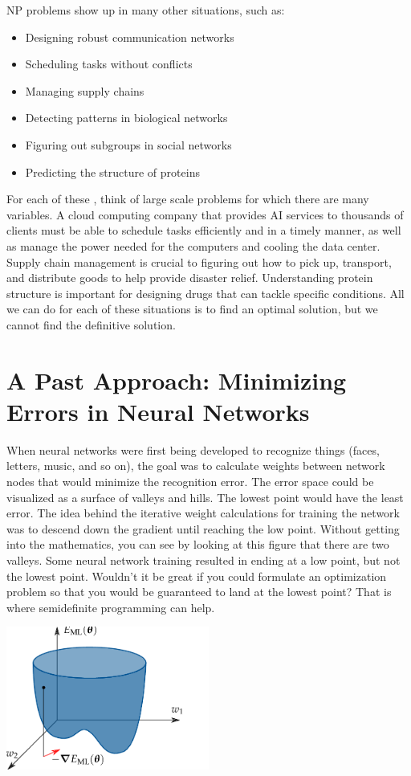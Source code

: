 NP problems show up in many other situations, such as:
\begin{itemize}
\item Designing  robust communication networks
\item Scheduling tasks without conflicts
\item Managing supply chains
\item Detecting patterns in biological networks
\item Figuring out subgroups in social networks
\item Predicting the structure of proteins
\end{itemize}

For each of these , think of large scale problems for which there are many variables. A cloud computing company that provides AI services to thousands of clients must be able to schedule tasks efficiently and in a timely manner, as well as manage the power needed for the computers and cooling the data center. Supply chain management is crucial to figuring out how to pick up, transport, and distribute goods to help provide disaster relief. Understanding protein structure is important for designing drugs that can tackle specific conditions. All we can do for each of these situations is to find an optimal solution, but we cannot find the definitive solution.

\section{A Past Approach: Minimizing Errors in Neural Networks}

When neural networks were first being developed to recognize things (faces, letters, music, and so on), the goal was to calculate weights between network nodes that would minimize the recognition error. The error space could be visualized as a surface of valleys and hills. The lowest point would have the least error. The idea behind the iterative weight calculations for training the network was to descend down the gradient until reaching the low point. Without getting into the mathematics, you can see by looking at this figure that there are two valleys. Some neural network training resulted in ending at a low point, but not the lowest point. Wouldn’t it be great if you could formulate an optimization problem so that you would be guaranteed to land at the lowest point? That is where semidefinite programming can help.

\includegraphics[width=0.5\textwidth]{neuralnet-error-function.png}

